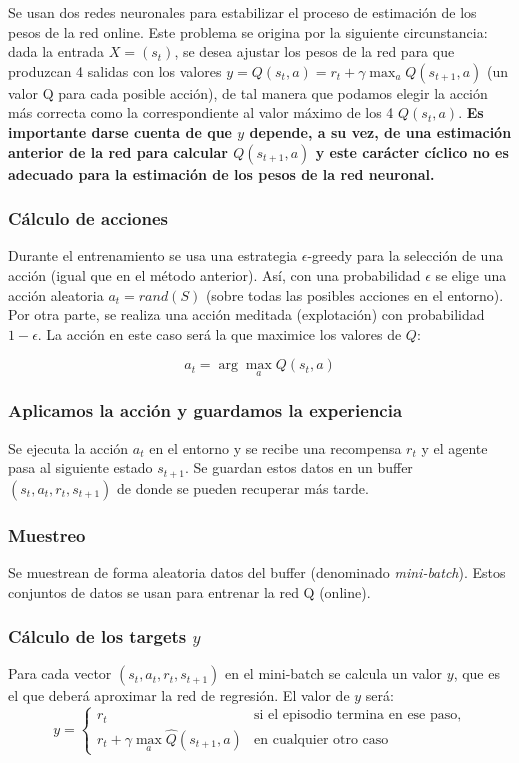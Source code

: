 \documentclass{article}
\begin{document}
Se usan dos redes neuronales para estabilizar el proceso de estimación de los pesos de la red online. Este problema se origina por la siguiente circunstancia: dada la entrada $X=(s_t)$, se desea ajustar los pesos de la red para que produzcan 4 salidas con los valores $y=Q(s_t, a) = r_t + \gamma\max_a Q(s_{t+1}, a)$ (un valor Q para cada posible acción), de tal manera que podamos elegir la acción más correcta como la correspondiente al valor máximo de los 4 $Q(s_t, a)$. \textbf{Es importante darse cuenta de que $y$ depende, a su vez, de una estimación anterior de la red para calcular $Q(s_{t+1}, a)$ y este carácter cíclico no es adecuado para la estimación de los pesos de la red neuronal.} 

\subsubsection{Cálculo de acciones}
Durante el entrenamiento se usa una estrategia $\epsilon$-greedy para la selección de una acción (igual que en el método anterior). Así, con una probabilidad $\epsilon$ se elige una acción aleatoria $a_t=rand(S)$ (sobre todas las posibles acciones en el entorno). Por otra parte,  se realiza una acción meditada (explotación) con probabilidad $1-\epsilon$. La acción en este caso será la que maximice los valores de $Q$: 

$$a_t = \arg \max_a{Q(s_t, a)}$$



\subsubsection{Aplicamos la acción y guardamos la experiencia}
Se ejecuta la acción $a_t$ en el entorno y se recibe una recompensa $r_t$ y el agente pasa al siguiente estado $s_{t+1}$. Se guardan estos datos en un buffer $(s_t, a_t, r_t, s_{t+1})$ de donde se pueden recuperar más tarde.

\subsubsection{Muestreo}
Se muestrean de forma aleatoria datos del buffer (denominado \textit{mini-batch}). Estos conjuntos de datos se usan para entrenar la red Q (online).

\subsubsection{Cálculo de los targets $y$}
Para cada vector $(s_t, a_t, r_t, s_{t+1})$ en el mini-batch se calcula un valor $y$, que es el que deberá aproximar la red de regresión. El valor de $y$ será:
\begin{equation*}
y = 
\begin{cases}
    r_t & \text{si el episodio termina en ese paso}, \\
    r_t + \gamma \max_a{\hat{Q}(s_{t+1}, a)}   & \text{en cualquier otro caso } 
\end{cases}
\end{equation*}
\end{document}
